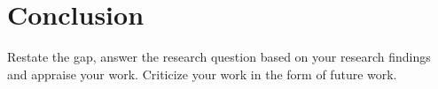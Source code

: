 \documentclass[12pt, twoside]{report}
\begin{document}
\chapter{Conclusion}  
\thispagestyle{empty} 
Restate the gap, answer the research question based on your research findings and appraise your work. Criticize your work in the form of future work. 


\thispagestyle{empty}
\end{document}
